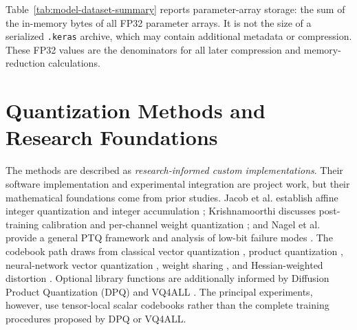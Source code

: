 \documentclass[conference]{IEEEtran}
\begin{document}
\begin{table}[t]
\caption{Models, datasets, and FP32 reference measurements}
\label{tab:model-dataset-summary}
\centering
\small
{}
\end{table}

Table~\ref{tab:model-dataset-summary} reports parameter-array storage: the sum of the in-memory bytes of all FP32 parameter arrays. It is not the size of a serialized \texttt{.keras} archive, which may contain additional metadata or compression. These FP32 values are the denominators for all later compression and memory-reduction calculations.

\section{Quantization Methods and Research Foundations}
\label{sec:methods}

The methods are described as \emph{research-informed custom implementations}. Their software implementation and experimental integration are project work, but their mathematical foundations come from prior studies. Jacob et al. establish affine integer quantization and integer accumulation \cite{jacob2018}; Krishnamoorthi discusses post-training calibration and per-channel weight quantization \cite{krishnamoorthi2018}; and Nagel et al. provide a general PTQ framework and analysis of low-bit failure modes \cite{nagel2021}. The codebook path draws from classical vector quantization \cite{gray1984}, product quantization \cite{jegou2011}, neural-network vector quantization \cite{gong2014}, weight sharing \cite{han2016}, and Hessian-weighted distortion \cite{choi2017}. Optional library functions are additionally informed by Diffusion Product Quantization (DPQ) \cite{shao2024} and VQ4ALL \cite{deng2024}. The principal experiments, however, use tensor-local scalar codebooks rather than the complete training procedures proposed by DPQ or VQ4ALL.
\end{document}
